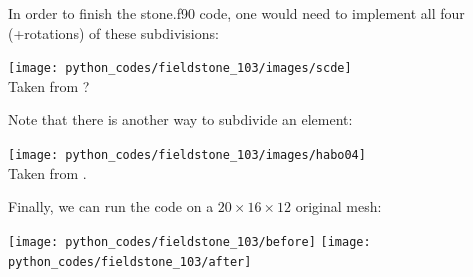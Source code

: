 In order to finish the {\filenamefont stone.f90} code, one would need to 
implement all four (+rotations) of these subdivisions:
\begin{center}
\texttt{[image: python\_codes/fieldstone\_103/images/scde]}\\
{\captionfont Taken from ?}
\end{center}

Note that there is another way to subdivide an element:
\begin{center}
\texttt{[image: python\_codes/fieldstone\_103/images/habo04]}\\
{\captionfont Taken from \cite{habo04}.}
\end{center}

Finally, we can run the code on a $20\times16\times12$ original mesh:
\begin{center}
\texttt{[image: python\_codes/fieldstone\_103/before]}
\texttt{[image: python\_codes/fieldstone\_103/after]}
\end{center}

